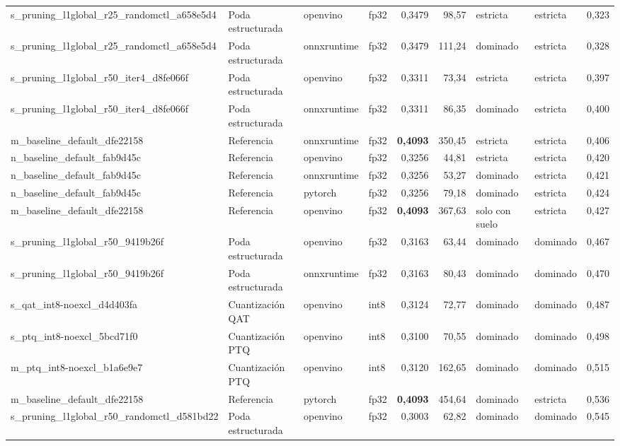 \begin{landscape}
\begin{table}[htbp]
\begin{adjustbox}{max width=\linewidth, max totalheight=\dimexpr\textheight-\ht\tfmedgetitle-\dp\tfmedgetitle-\ht\tfmedgenotes-\dp\tfmedgenotes-6pt\relax}
\begin{tabular}{llllrrllr}
    s\_pruning\_l1global\_r25\_randomctl\_a658e5d4 & Poda estructurada & openvino & fp32 & 0,3479 & 98,57 & estricta & estricta & 0,323 \\
    s\_pruning\_l1global\_r25\_randomctl\_a658e5d4 & Poda estructurada & onnxruntime & fp32 & 0,3479 & 111,24 & dominado & estricta & 0,328 \\
    s\_pruning\_l1global\_r50\_iter4\_d8fe066f & Poda estructurada & openvino & fp32 & 0,3311 & 73,34 & estricta & estricta & 0,397 \\
    s\_pruning\_l1global\_r50\_iter4\_d8fe066f & Poda estructurada & onnxruntime & fp32 & 0,3311 & 86,35 & dominado & estricta & 0,400 \\
    m\_baseline\_default\_dfe22158 & Referencia & onnxruntime & fp32 & \textbf{0,4093} & 350,45 & estricta & estricta & 0,406 \\
    n\_baseline\_default\_fab9d45c & Referencia & openvino & fp32 & 0,3256 & 44,81 & estricta & estricta & 0,420 \\
    n\_baseline\_default\_fab9d45c & Referencia & onnxruntime & fp32 & 0,3256 & 53,27 & dominado & estricta & 0,421 \\
    n\_baseline\_default\_fab9d45c & Referencia & pytorch & fp32 & 0,3256 & 79,18 & dominado & estricta & 0,424 \\
    m\_baseline\_default\_dfe22158 & Referencia & openvino & fp32 & \textbf{0,4093} & 367,63 & solo con suelo & estricta & 0,427 \\
    s\_pruning\_l1global\_r50\_9419b26f & Poda estructurada & openvino & fp32 & 0,3163 & 63,44 & dominado & dominado & 0,467 \\
    s\_pruning\_l1global\_r50\_9419b26f & Poda estructurada & onnxruntime & fp32 & 0,3163 & 80,43 & dominado & dominado & 0,470 \\
    s\_qat\_int8-noexcl\_d4d403fa & Cuantización QAT & openvino & int8 & 0,3124 & 72,77 & dominado & dominado & 0,487 \\
    s\_ptq\_int8-noexcl\_5bcd71f0 & Cuantización PTQ & openvino & int8 & 0,3100 & 70,55 & dominado & dominado & 0,498 \\
    m\_ptq\_int8-noexcl\_b1a6e9e7 & Cuantización PTQ & openvino & int8 & 0,3120 & 162,65 & dominado & dominado & 0,515 \\
    m\_baseline\_default\_dfe22158 & Referencia & pytorch & fp32 & \textbf{0,4093} & 454,64 & dominado & estricta & 0,536 \\
    s\_pruning\_l1global\_r50\_randomctl\_d581bd22 & Poda estructurada & openvino & fp32 & 0,3003 & 62,82 & dominado & dominado & 0,545 \\

\end{tabular}
\end{adjustbox}
\end{table}
\end{landscape}
